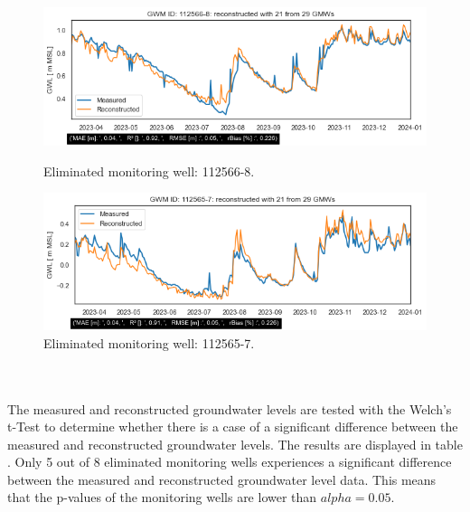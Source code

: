 \begin{figure}[h]
    \begin{minipage}{0.48\textwidth}
        \centering
        \includegraphics[width=\linewidth]{frontmatter/Rozenburg-fig/1125668roz.png}
        \caption{Eliminated monitoring well: 112566-8.}
        \label{112566-8}
    \end{minipage}\hfill
    \begin{minipage}{0.48\textwidth}
        \centering
        \includegraphics[width=\linewidth]{frontmatter/Rozenburg-fig/1125657roz.png}
        \caption{Eliminated monitoring well: 112565-7.}
        \label{roz8}
    \end{minipage}
\end{figure}\\
\\
The measured and reconstructed groundwater levels are tested with the Welch's t-Test to determine whether there is a case of a significant difference between the measured and reconstructed groundwater levels. The results are displayed in table . Only 5 out of 8 eliminated monitoring wells experiences a significant difference between the measured and reconstructed groundwater level data. This means that the p-values of the monitoring wells are lower than \(alpha = 0.05\). 

